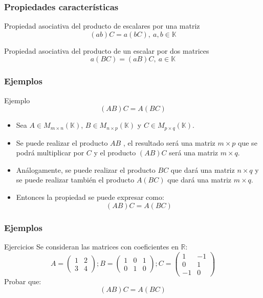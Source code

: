\documentclass[aspectratio=169]{beamer}
\begin{document}
 
    
   \begin{frame}
  \frametitle{Propiedades caracter\'isticas}
  
   \begin{block}{Propiedad asociativa del producto de escalares por una matriz}
   \[(ab)C = a(bC), \ a,b\in\mathbb{K} \]
  \end{block}
  
  
     \begin{block}{Propiedad asociativa del producto de un escalar por dos matrices}
   \[a(BC) = (aB)C, \ a\in\mathbb{K}\]
  \end{block}
  
  
 \end{frame}
 
 
 
   \begin{frame}
  \frametitle{Ejemplos}
  
   \begin{block}{Ejemplo}
   \[(AB)C=A(BC) \]
  \end{block}
   \begin{itemize}

 \item Sea $A\in M_{m\times n}(\mathbb{K})$,  $B\in M_{n\times p}(\mathbb{K})$ y $C\in M_{p\times q}(\mathbb{K})$.
 
 \item Se puede realizar el producto $AB$ , el resultado ser\'a una matriz $m\times p$ que se podr\'a multiplicar por $C$ y el producto $(AB)C$ ser\'a una matriz $m\times q$. 
 
\item  An\'alogamente, se puede realizar el producto $BC$ que dar\'a una matriz $n\times q$ y se puede realizar tambi\'en el producto $A(BC)$ que dar\'a una matriz $m\times q$.
 
 \item Entonces la propiedad se puede expresar como:
     \[(AB)C=A(BC) \]
\end{itemize}
 \end{frame} 
 
 
 
    \begin{frame}
  \frametitle{Ejemplos}
  
   \begin{block}{Ejercicios}
   Se consideran las matrices con coeficientes en $\mathbb{R}$:
  \[ A = \left(\begin{array}{cc}1 & 2 \\3 & 4\end{array}\right);
  B = \left(\begin{array}{ccc}1 & 0 & 1 \\0 & 1 & 0\end{array}\right);
  C = \left(\begin{array}{cc}1 & -1 \\0 & 1 \\-1 & 0\end{array}\right)
  \]
  Probar que:
      \[(AB)C=A(BC) \]

  \end{block}


 \end{frame} 
 
\end{document}
